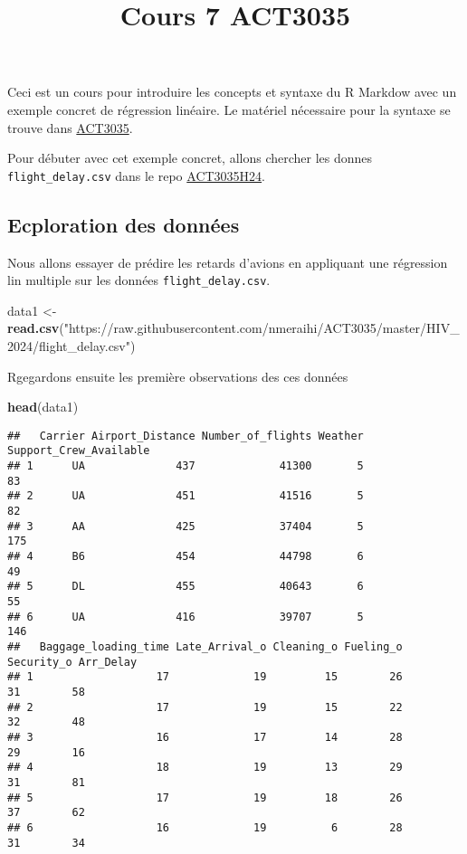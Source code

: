 \documentclass[
]{article}
\title{Cours 7 ACT3035}
\author{}
\date{\vspace{-2.5em}}
\newenvironment{Shaded}{\begin{snugshade}}{\end{snugshade}}
\newcommand{\FunctionTok}[1]{\textcolor[rgb]{0.13,0.29,0.53}{\textbf{#1}}}
\newcommand{\NormalTok}[1]{#1}
\newcommand{\OtherTok}[1]{\textcolor[rgb]{0.56,0.35,0.01}{#1}}
\newcommand{\StringTok}[1]{\textcolor[rgb]{0.31,0.60,0.02}{#1}}
\begin{document}
\maketitle

Ceci est un cours pour introduire les concepts et syntaxe du R Markdow
avec un exemple concret de régression linéaire. Le matériel nécessaire
pour la syntaxe se trouve dans
\href{https://nmeraihi.github.io/act3035book/sommaire.html}{ACT3035}.

Pour débuter avec cet exemple concret, allons chercher les donnes
\texttt{flight\_delay.csv} dans le repo
\href{https://github.com/nmeraihi/ACT3035/tree/master/HIV_2024}{ACT3035H24}.

\hypertarget{ecploration-des-donnuxe9es}{%
\subsection{Ecploration des données}\label{ecploration-des-donnuxe9es}}

Nous allons essayer de prédire les retards d'avions en appliquant une
régression lin multiple sur les données \texttt{flight\_delay.csv}.

\begin{Shaded}
\begin{Highlighting}[]
\NormalTok{data1 }\OtherTok{\textless{}{-}} \FunctionTok{read.csv}\NormalTok{(}\StringTok{"https://raw.githubusercontent.com/nmeraihi/ACT3035/master/HIV\_2024/flight\_delay.csv"}\NormalTok{)}
\end{Highlighting}
\end{Shaded}

Rgegardons ensuite les première observations des ces données

\begin{Shaded}
\begin{Highlighting}[]
\FunctionTok{head}\NormalTok{(data1)}
\end{Highlighting}
\end{Shaded}

\begin{verbatim}
##   Carrier Airport_Distance Number_of_flights Weather Support_Crew_Available
## 1      UA              437             41300       5                     83
## 2      UA              451             41516       5                     82
## 3      AA              425             37404       5                    175
## 4      B6              454             44798       6                     49
## 5      DL              455             40643       6                     55
## 6      UA              416             39707       5                    146
##   Baggage_loading_time Late_Arrival_o Cleaning_o Fueling_o Security_o Arr_Delay
## 1                   17             19         15        26         31        58
## 2                   17             19         15        22         32        48
## 3                   16             17         14        28         29        16
## 4                   18             19         13        29         31        81
## 5                   17             19         18        26         37        62
## 6                   16             19          6        28         31        34
\end{verbatim}
\end{document}
